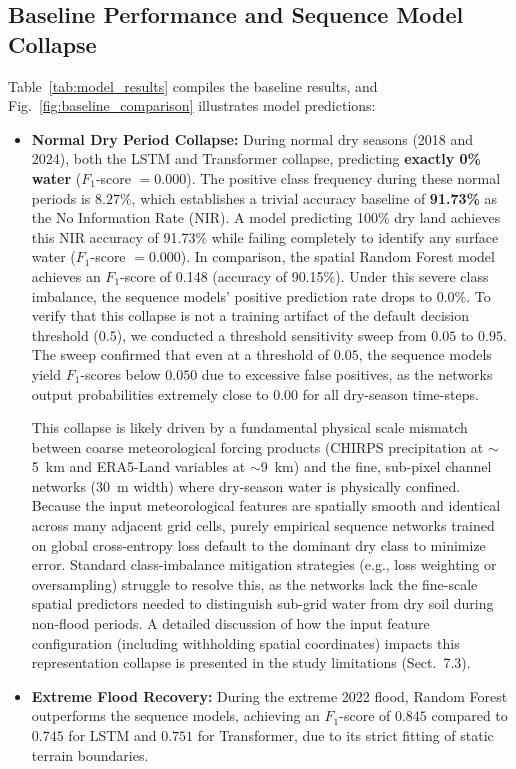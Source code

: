 \subsection{Baseline Performance and Sequence Model Collapse}
Table~\ref{tab:model_results} compiles the baseline results, and Fig.~\ref{fig:baseline_comparison} illustrates model predictions:
\begin{itemize}
    \item \textbf{Normal Dry Period Collapse:} During normal dry seasons (2018 and 2024), both the LSTM and Transformer collapse, predicting \textbf{exactly 0\% water} ($F_1$-score $= 0.000$). The positive class frequency during these normal periods is $8.27\%$, which establishes a trivial accuracy baseline of \textbf{91.73\%} as the No Information Rate (NIR). A model predicting 100\% dry land achieves this NIR accuracy of 91.73\% while failing completely to identify any surface water ($F_1$-score $= 0.000$). In comparison, the spatial Random Forest model achieves an $F_1$-score of 0.148 (accuracy of 90.15\%). Under this severe class imbalance, the sequence models' positive prediction rate drops to $0.0\%$. To verify that this collapse is not a training artifact of the default decision threshold ($0.5$), we conducted a threshold sensitivity sweep from $0.05$ to $0.95$. The sweep confirmed that even at a threshold of $0.05$, the sequence models yield $F_1$-scores below $0.050$ due to excessive false positives, as the networks output probabilities extremely close to $0.00$ for all dry-season time-steps.

    This collapse is likely driven by a fundamental physical scale mismatch between coarse meteorological forcing products (CHIRPS precipitation at $\sim$5~km and ERA5-Land variables at $\sim$9~km) and the fine, sub-pixel channel networks (30~m width) where dry-season water is physically confined. Because the input meteorological features are spatially smooth and identical across many adjacent grid cells, purely empirical sequence networks trained on global cross-entropy loss default to the dominant dry class to minimize error. Standard class-imbalance mitigation strategies (e.g., loss weighting or oversampling) struggle to resolve this, as the networks lack the fine-scale spatial predictors needed to distinguish sub-grid water from dry soil during non-flood periods. A detailed discussion of how the input feature configuration (including withholding spatial coordinates) impacts this representation collapse is presented in the study limitations (Sect.~7.3).
    \item \textbf{Extreme Flood Recovery:} During the extreme 2022 flood, Random Forest outperforms the sequence models, achieving an $F_1$-score of $0.845$ compared to $0.745$ for LSTM and $0.751$ for Transformer, due to its strict fitting of static terrain boundaries.
\end{itemize}


